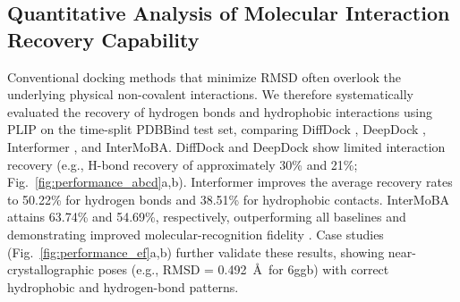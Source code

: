 \documentclass[11pt,a4paper]{article}
\theoremstyle{plain}
\theoremstyle{definition}
\begin{document}
\subsection{Quantitative Analysis of Molecular Interaction Recovery Capability}
Conventional docking methods that minimize RMSD often overlook the underlying physical non-covalent interactions. We therefore systematically evaluated the recovery of hydrogen bonds and hydrophobic interactions using PLIP \cite{salentin2015plip} on the time-split PDBBind \cite{wang2005pdbbind} test set, comparing DiffDock \cite{corso2022diffdock}, DeepDock \cite{liao2019deepdock}, Interformer \cite{lai2024interformer}, and InterMoBA. DiffDock and DeepDock show limited interaction recovery (e.g., H-bond recovery of approximately 30\% and 21\%; Fig.~\ref{fig:performance_abcd}a,b). Interformer improves the average recovery rates to 50.22\% for hydrogen bonds and 38.51\% for hydrophobic contacts. InterMoBA attains 63.74\% and 54.69\%, respectively, outperforming all baselines and demonstrating improved molecular-recognition fidelity \cite{buttenschoen2024posebusters}. Case studies (Fig.~\ref{fig:performance_ef}a,b) further validate these results, showing near-crystallographic poses (e.g., RMSD = 0.492~\AA\ for 6ggb) with correct hydrophobic and hydrogen-bond patterns.
\end{document}
